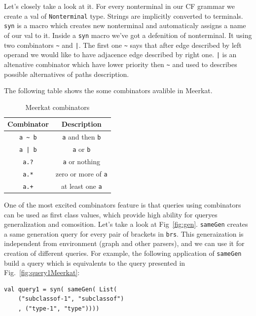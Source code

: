 Let's closely take a look at it.
For every nonterminal in our CF grammar we create a val of  \lstinline{Nonterminal} type.
Strings are implicitly converted to terminals.
\lstinline{syn} is a macro which creates new nonterminal and automaticaly assigns a name of our val to it.
Inside a \lstinline{syn} macro we've got a defenition of nonterminal.
It using two combinators \lstinline{~} and \lstinline{|}.
The first one \lstinline{~} says that after edge described by left operand we would like to have adjacence edge described by right one.
\lstinline{|} is an altenative combinator which have lower priority then \lstinline{~} and used to describes possible alternatives of paths description.

The following table shows the some combinators avalible in Meerkat. 

\begin{table}[h]
\centering
\begin{tabular}{|c|c|}
\hline
\multicolumn{1}{|c|}{Combinator} & \multicolumn{1}{c|}{Description} \\ \hline
{\lstinline!a ~ b!} & {\lstinline!a!} and then {\lstinline!b!}   \\
{\lstinline!a | b!} & {\lstinline!a!} or {\lstinline!b!}         \\
{\lstinline!a.?!}   & {\lstinline!a!} or nothing   \\
{\lstinline!a.*!}   & zero or more of {\lstinline!a!} \\
{\lstinline!a.+!}   & at least one {\lstinline!a!} \\
\hline
\end{tabular}
\caption{Meerkat combinators}
\label{table:combinators}
\end{table}

One of the most excited combinators feature is that queries using combinators can be used as first class values, which provide high ability for queryes generalization and comosition.
Let's take a look at Fig~\ref{fig:gen}. \lstinline{sameGen} creates a same generation query for every pair of brackets in \lstinline{brs}.
This generaization is independent from environment (graph and other parsers), and we can use it for creation of different queries.
For example, the following application of \lstinline{sameGen} build a query which is equivalents to the query presented in Fig.~\ref{fig:query1Meerkat}:

\begin{lstlisting}
val query1 = syn( sameGen( List(
    ("subclassof-1", "subclassof")
    , ("type-1", "type"))))
\end{lstlisting}

